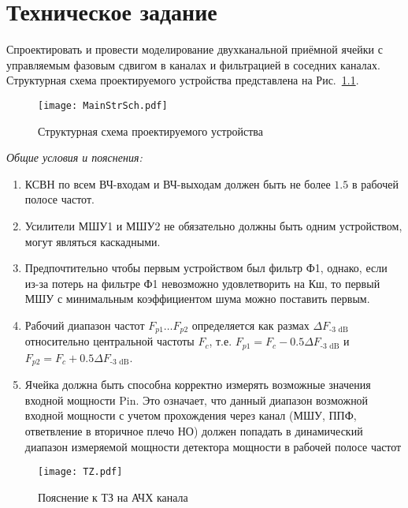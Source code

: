 \chapter{Техническое задание}

Спроектировать и провести моделирование двухканальной приёмной ячейки с управляемым фазовым сдвигом в каналах и фильтрацией в соседних каналах.
Структурная схема проектируемого устройства представлена на Рис.~\ref{fig:tor_structure_schematic}.

\begin{figure}[!ht]
	\centering
	\texttt{[image: MainStrSch.pdf]}
	\caption{Структурная схема проектируемого устройства}%
	\label{fig:tor_structure_schematic}
\end{figure}

\textit{Общие условия и пояснения:}
\begin{enumerate}
	\item
	КСВН по всем ВЧ-входам и ВЧ-выходам должен быть не более $1.5$ в рабочей полосе частот.
	\item
	Усилители МШУ1 и МШУ2 не обязательно должны быть одним устройством, могут являться каскадными.
	\item
	Предпочтительно чтобы первым устройством был фильтр Ф1, однако, если из-за потерь на фильтре Ф1 невозможно удовлетворить на Кш, то первый МШУ с минимальным коэффициентом шума можно поставить первым.
	\item
	Рабочий диапазон частот $F_{p1} \ldots F_{p2}$ определяется как размах $\Delta F_\text{-3~dB}$ относительно центральной частоты $F_c$, т.е. $F_{p1} = F_c - 0.5 \Delta F_\text{-3~dB}$ и $F_{p2} = F_c + 0.5 \Delta F_\text{-3~dB}$.
	\item
	Ячейка должна быть способна корректно измерять возможные значения входной мощности Pin. Это означает, что данный диапазон возможной входной мощности с учетом прохождения через канал (МШУ, ППФ, ответвление в вторичное плечо НО) должен попадать в динамический диапазон измеряемой мощности детектора мощности в рабочей полосе частот
\end{enumerate}

\begin{figure}[!ht]
	\centering
	\texttt{[image: TZ.pdf]}
	\caption{Пояснение к ТЗ на АЧХ канала}%
	\label{fig:tor_response}
\end{figure}




